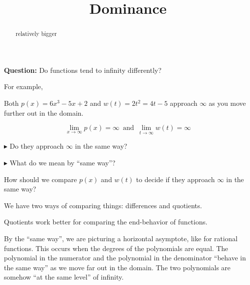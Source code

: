 \documentclass{ximera}
\title{Dominance}
\begin{document}
\begin{abstract}
relatively bigger
\end{abstract}
\maketitle







\textbf{Question:} Do functions tend to infinity differently? 



For example,

Both $p(x) = 6x^3 - 5x + 2$ and $w(t) = 2t^2 = 4t - 5$ approach $\infty$ as you move further out in the domain.



\[    \lim_{x \to \infty} p(x) = \infty  \, \text{ and }  \,       \lim_{t \to \infty} w(t) = \infty                \]

\textbf{\textcolor{blue!55!black}{$\blacktriangleright$}} Do they approach $\infty$ in the same way? 

\textbf{\textcolor{blue!55!black}{$\blacktriangleright$}} What do we mean by ``same way''?  



How should we compare $p(x)$ and $w(t)$ to decide if they approach $\infty$ in the same way?  


We have two ways of comparing things: differences and quotients. 

Quotients work better for comparing the end-behavior of functions. 


By the ``same way'', we are picturing a horizontal asymptote, like for rational functions. This occurs when the degrees of the polynomials are equal.   The polynomial in the numerator and the polynomial in the denominator ``behave in the same way'' as we move far out in the domain.  The two polynomials are somehow ``at the same level'' of infinity. 
\end{document}
